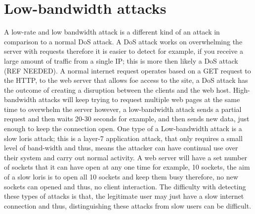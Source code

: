 
\section{Low-bandwidth attacks} \label{attack1}

A low-rate and low bandwidth attack is a different kind of an attack in comparison to a normal DoS attack. A DoS attack works on overwhelming the server with requests therefore it is easier to detect for example, if you receive a large amount of traffic from a single IP; this is more then likely a DoS attack (REF NEEDED). A normal internet request operates based on a GET request to the HTTP, to the web server that allows foe access to the site, a DoS attack has the outcome of creating a disruption between the clients and the web host. High-bandwidth attacks will keep trying to request multiple web pages at the same time to overwhelm the server however, a low-bandwidth attack sends a partial request and then waits 20-30 seconds for example, and then sends new data, just enough to keep the connection open. One type of a Low-bandwidth attack is a slow loris attack; this is a layer-7 application attack, that only requires a small level of band-width and thus, means the attacker can have continual use over their system and carry out normal activity. A web server will have a set number of sockets that it can have open at any one time for example, 10 sockets, the aim of a slow loris is to open all 10 sockets and keep them busy therefore, no new sockets can opened and thus, no client interaction. The difficulty with detecting these types of attacks is that, the legitimate user may just have a slow internet connection and thus, distinguishing these attacks from slow users can be difficult. 